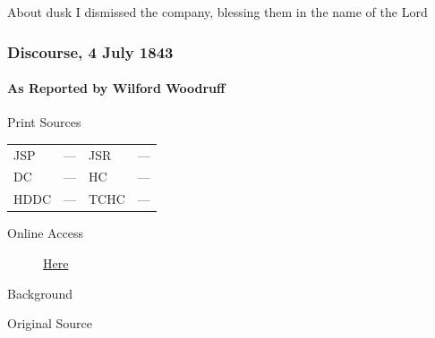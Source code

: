 				About dusk I dismissed the company, blessing them in the name of the Lord
				
		\subsubsection{Discourse, 4 July 1843}
			\label{EMS-1843-JS-4-JUL-1843}
			
			\paragraph{As Reported by Wilford Woodruff}
				\label{EMS-1843-JS-4-JUL-1843-WW}
			
				\begin{description}
					\item[Print Sources]
				\end{description}

					\begin{tabular}{p{0.5in}p{1in}p{0.5in}p{1in}}
					JSP	 	& ---		& JSR 		& --- \\
					DC	 	& ---		& HC 		& --- \\
					HDDC 	& ---		& TCHC 		& --- \\
					\end{tabular}
				
				\begin{description}
					\item[Online Access] \href{https://www.josephsmithpapers.org/paper-summary/discourse-4-july-1843-as-reported-by-wilford-woodruff/1}{Here}
				\end{description}
				
				\begin{description}
					\item[Background]
				\end{description}
				
				
				\begin{description}
					\item[Original Source]
				\end{description}
				
